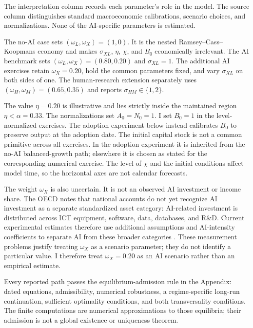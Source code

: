 The interpretation column records each parameter's role in the model. The source
column distinguishes standard macroeconomic calibrations, scenario choices, and
normalizations. None of the AI-specific parameters is estimated.

The no-AI case sets \((\omega_L,\omega_X)=(1,0)\). It is the nested
Ramsey--Cass--Koopmans economy and makes \(\sigma_{XL}\), \(\eta\), \(\chi\),
and \(B_0\) economically irrelevant. The AI benchmark sets
\((\omega_L,\omega_X)=(0.80,0.20)\) and \(\sigma_{XL}=1\). The additional AI
exercises retain \(\omega_X=0.20\), hold the common parameters fixed, and vary
\(\sigma_{XL}\) on both sides of one. The human-research extension separately uses
\((\omega_H,\omega_M)=(0.65,0.35)\) and reports
\(\sigma_{HM}\in\{1,2\}\).

The value \(\eta=0.20\) is illustrative and lies strictly inside the maintained
region \(\eta<\alpha=0.33\). The normalizations set \(A_0=N_0=1\). I set
\(B_0=1\) in the level-normalized exercises. The adoption experiment below
instead calibrates \(B_0\) to preserve output at the adoption date. The initial
capital stock is not a common primitive across all exercises. In the adoption
experiment it is inherited from the no-AI balanced-growth path; elsewhere it
is chosen as stated for the corresponding numerical exercise. The level of
\(\chi\) and the initial conditions affect model time, so the horizontal axes
are not calendar forecasts.

The weight \(\omega_X\) is also uncertain. It is not an observed AI investment
or income share. The OECD notes that national accounts do not yet recognize AI
investment as a separate standardized asset category: AI-related investment is
distributed across ICT equipment, software, data, databases, and R\&D. Current
experimental estimates therefore use additional assumptions and AI-intensity
coefficients to separate AI from these broader categories
\citep{oecdaiinvestment2025,oecdproductivity2026}. These measurement problems
justify treating \(\omega_X\) as a scenario parameter; they do not identify a
particular value. I therefore treat \(\omega_X=0.20\) as an AI scenario rather
than an empirical estimate.

Every reported path passes the equilibrium-admission rule in the Appendix:
dated equations, admissibility, numerical robustness, a regime-specific
long-run continuation, sufficient optimality conditions, and both
transversality conditions. The
finite computations are numerical approximations to those equilibria; their
admission is not a global existence or uniqueness theorem.

